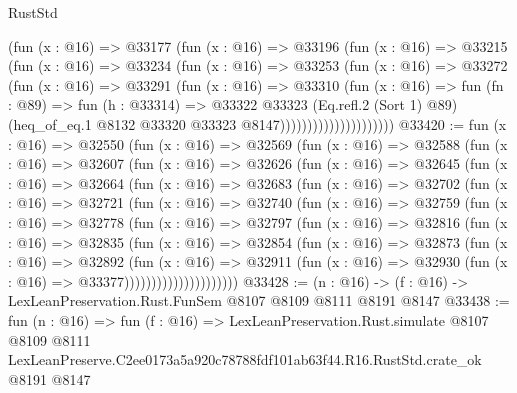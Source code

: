\begin{lexlean}{RustStd}
\begin{coremodule}
                          (fun (x : @16) =>
                          @33177
                            (fun (x : @16) =>
                            @33196
                              (fun (x : @16) =>
                              @33215
                                (fun (x : @16) =>
                                @33234
                                  (fun (x : @16) =>
                                  @33253
                                    (fun (x : @16) =>
                                    @33272
                                      (fun (x : @16) =>
                                      @33291
                                        (fun (x : @16) =>
                                        @33310
                                          (fun (x : @16) =>
                                          fun (fn : @89) =>
                                          fun (h : @33314) =>
                                          @33322
                                            @33323
                                            (Eq.refl.{2} (Sort 1) @89)
                                            (heq_of_eq.{1}
                                              @8132
                                              @33320
                                              @33323
                                              @8147)))))))))))))))))))))
@33420 := fun (x : @16) =>
  @32550
    (fun (x : @16) =>
    @32569
      (fun (x : @16) =>
      @32588
        (fun (x : @16) =>
        @32607
          (fun (x : @16) =>
          @32626
            (fun (x : @16) =>
            @32645
              (fun (x : @16) =>
              @32664
                (fun (x : @16) =>
                @32683
                  (fun (x : @16) =>
                  @32702
                    (fun (x : @16) =>
                    @32721
                      (fun (x : @16) =>
                      @32740
                        (fun (x : @16) =>
                        @32759
                          (fun (x : @16) =>
                          @32778
                            (fun (x : @16) =>
                            @32797
                              (fun (x : @16) =>
                              @32816
                                (fun (x : @16) =>
                                @32835
                                  (fun (x : @16) =>
                                  @32854
                                    (fun (x : @16) =>
                                    @32873
                                      (fun (x : @16) =>
                                      @32892
                                        (fun (x : @16) =>
                                        @32911
                                          (fun (x : @16) =>
                                          @32930 (fun (x : @16) => @33377)))))))))))))))))))))
@33428 := (n : @16) -> (f : @16) -> LexLeanPreservation.Rust.FunSem @8107 @8109 @8111 @8191 @8147
@33438 := fun (n : @16) =>
  fun (f : @16) =>
  LexLeanPreservation.Rust.simulate
    @8107
    @8109
    @8111
    LexLeanPreserve.C2ee0173a5a920c78788fdf101ab63f44.R16.RustStd.crate_ok
    @8191
    @8147
\end{coremodule}
\end{lexlean}
